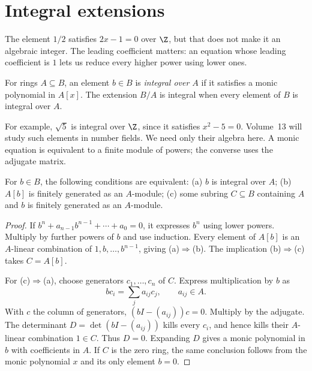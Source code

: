\section{Integral extensions}

The element $1/2$ satisfies $2x-1=0$ over $\Z$, but that does not make it an algebraic integer. The leading coefficient matters: an equation whose leading coefficient is $1$ lets us reduce every higher power using lower ones.

\begin{definition}\label{def:integral}
For rings $A\subseteq B$, an element $b\in B$ is \emph{integral over $A$} if it satisfies a monic polynomial in $A[x]$. The extension $B/A$ is integral when every element of $B$ is integral over $A$.
\end{definition}

For example, $\sqrt5$ is integral over $\Z$, since it satisfies $x^2-5=0$. Volume~13 will study such elements in number fields. We need only their algebra here. A monic equation is equivalent to a finite module of powers; the converse uses the adjugate matrix.

\begin{proposition}\label{prop:integralcrit}
For $b\in B$, the following conditions are equivalent:
(a) $b$ is integral over $A$;
(b) $A[b]$ is finitely generated as an $A$-module;
(c) some subring $C\subseteq B$ containing $A$ and $b$ is finitely generated as an $A$-module.
\end{proposition}

\begin{proof}
If $b^n+a_{n-1}b^{n-1}+\cdots+a_0=0$, it expresses $b^n$ using lower powers. Multiply by further powers of $b$ and use induction. Every element of $A[b]$ is an $A$-linear combination of $1,b,\ldots,b^{n-1}$, giving (a)$\Rightarrow$(b). The implication (b)$\Rightarrow$(c) takes $C=A[b]$.

For (c)$\Rightarrow$(a), choose generators $c_1,\ldots,c_n$ of $C$. Express multiplication by $b$ as
\[
 bc_i=\sum_j a_{ij}c_j,\qquad a_{ij}\in A.
\]
With $c$ the column of generators, $(bI-(a_{ij}))c=0$. Multiply by the adjugate. The determinant $D=\det(bI-(a_{ij}))$ kills every $c_i$, and hence kills their $A$-linear combination $1\in C$. Thus $D=0$. Expanding $D$ gives a monic polynomial in $b$ with coefficients in $A$. If $C$ is the zero ring, the same conclusion follows from the monic polynomial $x$ and its only element $b=0$.
\end{proof}

